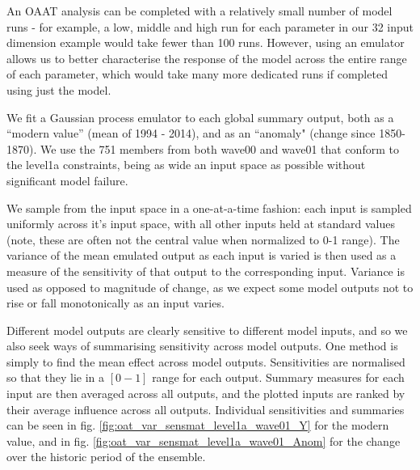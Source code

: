 \documentclass[gmd, manuscript]{copernicus}
\begin{document}
An OAAT analysis can be completed with a relatively small number of model runs - for example, a low, middle and high run for each parameter in our 32 input dimension example would take fewer than 100 runs. However, using an emulator allows us to better characterise the response of the model across the entire range of each parameter, which would take many more dedicated runs if completed using just the model.

We fit a Gaussian process emulator to each global summary output, both as a ``modern value'' (mean of 1994 - 2014), and as an ``anomaly" (change since 1850-1870). We use the 751 members from both wave00 and wave01 that conform to the level1a constraints, being as wide an input space as possible without significant model failure.

We sample from the input space in a one-at-a-time fashion: each input is sampled uniformly across it's input space, with all other inputs held at standard values (note, these are often not the central value when normalized to 0-1 range). The variance of the mean emulated output as each input is varied is then used as a measure of the sensitivity of that output to the corresponding input. Variance is used as opposed to magnitude of change, as we expect some model outputs not to rise or fall monotonically as an input varies.

Different model outputs are clearly sensitive to different model inputs, and so we also seek ways of summarising sensitivity across model outputs. One method is simply to find the mean effect across model outputs. Sensitivities are normalised so that they lie in a $[0 -1]$ range for each output. Summary measures for each input are then averaged across all outputs, and the plotted inputs are ranked by their average influence across all outputs. Individual sensitivities and summaries can be seen in fig. \ref{fig:oat_var_sensmat_level1a_wave01_Y} for the modern value, and in fig. \ref{fig:oat_var_sensmat_level1a_wave01_Anom} for the change over the historic period of the ensemble. 
\end{document}
